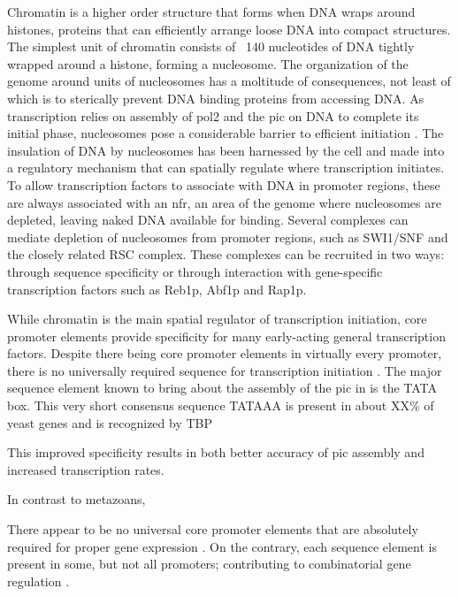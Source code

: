 Chromatin is a higher order structure that forms when DNA wraps around histones, proteins that can efficiently arrange loose DNA into compact structures.
The simplest unit of chromatin consists of ~140 nucleotides of DNA tightly wrapped around a histone, forming a nucleosome.
The organization of the genome around units of nucleosomes has a moltitude of consequences, not least of which is to sterically prevent DNA binding proteins from accessing DNA. 
As transcription relies on assembly of \gls{pol2} and the \gls{pic} on DNA to complete its initial phase, nucleosomes pose a considerable barrier to efficient initiation \cite{field:2008:distinct} \cite{jiang:2009:compiled}.
The insulation of DNA by nucleosomes has been harnessed by the cell and made into a regulatory mechanism that can spatially regulate where transcription initiates. 
To allow transcription factors to associate with DNA in promoter regions, these are always associated with an \gls{nfr}, an area of the genome where nucleosomes are depleted, leaving naked DNA available for binding.
Several complexes can mediate depletion of nucleosomes from promoter regions, such as SWI1/SNF and the closely related RSC complex.
These complexes can be recruited in two ways: through sequence specificity or through interaction with gene-specific transcription factors such as Reb1p, Abf1p and Rap1p.

While chromatin is the main spatial regulator of transcription initiation, core promoter elements provide specificity for many early-acting general transcription factors. 
Despite there being core promoter elements in virtually every promoter, there is no universally required sequence for transcription initiation \cite{butler:2002:RNA}.
The major sequence element known to bring about the assembly of the \gls{pic} in \cer is the TATA box.
This very short consensus sequence TATAAA is present in about XX\% of yeast genes and is recognized by TBP


This improved specificity results in both better  accuracy of pic assembly and increased transcription rates.




In contrast to metazoans, \cer 

There appear to be no universal core promoter elements that are absolutely required for proper gene expression .
On the contrary, each sequence element is present in some, but not all promoters; contributing to combinatorial gene regulation \cite{smale:2001:core}.

